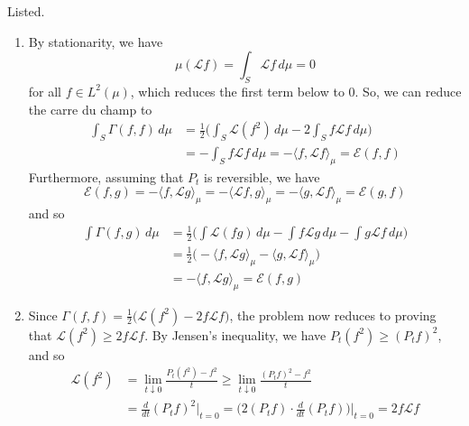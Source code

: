   \begin{solution}
    Listed. 
    \begin{enumerate}
      \item By stationarity, we have 
      \begin{equation}
        \mu ( \mathscr{L} f) = \int_S \mathscr{L} f \, d\mu = 0
      \end{equation}
      for all $f \in L^2 (\mu)$, which reduces the first term below to $0$. So, we can reduce the carre du champ to 
      \begin{align}
        \int_S \Gamma(f, f) \, d\mu & = \frac{1}{2} \bigg( \int_S \mathscr{L} (f^2) \, d\mu - 2 \int_S f \mathscr{L} f \, d\mu \bigg) \\
        & = - \int_S f \mathscr{L} f \, d\mu = - \langle f, \mathscr{L} f \rangle_\mu = \mathcal{E}(f, f)
      \end{align}
      Furthermore, assuming that $P_t$ is reversible, we have 
      \begin{equation}
        \mathcal{E}(f, g) = - \langle f, \mathscr{L} g \rangle_\mu = -\langle \mathscr{L} f, g \rangle_\mu = - \langle g, \mathscr{L} f \rangle_\mu = \mathcal{E}(g, f)
      \end{equation}
      and so 
      \begin{align}
        \int \Gamma (f, g) \, d\mu & = \frac{1}{2} \bigg( \int \mathscr{L}(f g) \, d\mu - \int f \mathscr{L} g \, d\mu - \int g \mathscr{L} f \, d\mu \bigg) \\
        & = \frac{1}{2} \big( - \langle f, \mathscr{L} g \rangle_\mu - \langle g, \mathscr{L} f\rangle_\mu \big) \\
        & = - \langle f, \mathscr{L} g \rangle_\mu = \mathcal{E}(f, g)
      \end{align}
      
      \item Since $\Gamma(f, f) = \frac{1}{2} \big( \mathscr{L} (f^2) - 2 f \mathscr{L}f \big)$, the problem now reduces to proving that $\mathscr{L} (f^2) \geq 2 f \mathscr{L}f$. By Jensen's inequality, we have $P_t (f^2) \geq (P_t f)^2$, and so 
      \begin{align}
        \mathscr{L}(f^2) & = \lim_{t \downarrow 0} \frac{P_t (f^2) - f^2}{t} \geq \lim_{t \downarrow 0} \frac{(P_t f)^2 - f^2}{t} \\
        & = \frac{d}{dt} (P_t f)^2 \bigg|_{t = 0} = \bigg( 2 (P_t f) \cdot \frac{d}{dt} (P_t f) \bigg)\bigg|_{t = 0} = 2 f \mathscr{L} f
      \end{align}
      

\end{enumerate}
\end{solution}
